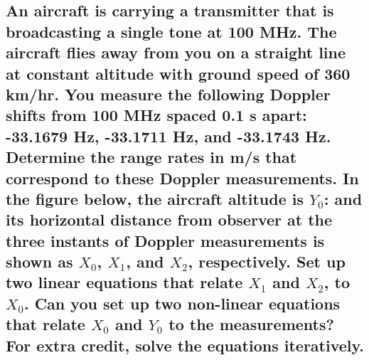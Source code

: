\documentclass[12pt]{article}
\begin{document}
  \subsection
  {
    An aircraft is carrying a transmitter that is broadcasting a single tone at 
    100 MHz. The aircraft flies away from you on a straight line at constant 
    altitude with ground speed of 360 km/hr. You measure the following Doppler 
    shifts from 100 MHz spaced 0.1 s apart: -33.1679 Hz, -33.1711 Hz, and 
    -33.1743 Hz. Determine the range rates in m/s that correspond to these 
    Doppler measurements. In the figure below, the aircraft altitude is $Y_0$: and 
    its horizontal distance from observer at the three instants of Doppler 
    measurements is shown as $X_0$, $X_1$, and $X_2$, respectively. Set up two linear 
    equations that relate $X_1$ and $X_2$, to $X_0$. Can you set up two non-linear 
    equations that relate $X_0$ and $Y_0$ to the measurements? For extra credit, 
    solve the equations iteratively.
  }
\end{document}
